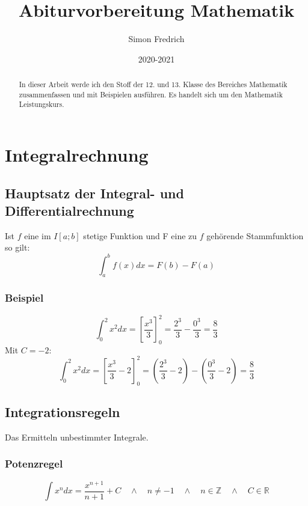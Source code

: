 \documentclass[12pt, a4paper]{report}
\title{Abiturvorbereitung Mathematik}
\author{Simon Fredrich}
\date{2020-2021}
\begin{document}
\begin{titlepage}
\maketitle
\end{titlepage}

\begin{abstract}
In dieser Arbeit werde ich den Stoff der 12. und 13. Klasse des Bereiches Mathematik zusammenfassen und mit Beispielen ausführen. Es handelt sich um den Mathematik Leistungskurs.
\end{abstract}

\chapter{Integralrechnung}

\section{Hauptsatz der Integral- und Differentialrechnung}
Ist $f$ eine im $I[a;b]$ stetige Funktion und F eine zu $f$ gehörende Stammfunktion so gilt:\\
\begin{equation}
\int_{a}^{b} f(x) dx = F(b)-F(a)
\end{equation}

\subsection{Beispiel}

\begin{equation}
\int_{0}^{2} x^2 dx = \left[\frac{x^3}{3}\right]_0^2=\frac{2^3}{3}-\frac{0^3}{3}=\frac{8}{3}
\end{equation}
Mit $C=-2$:
\begin{equation}
\int_{0}^{2} x^2 dx = \left[\frac{x^3}{3}-2\right]_0^2=\left(\frac{2^3}{3}-2\right)-\left(\frac{0^3}{3}-2\right)=\frac{8}{3}
\end{equation}

\section{Integrationsregeln}
Das Ermitteln unbestimmter Integrale.
\subsection{Potenzregel}
\begin{equation}
\int x^n dx = \frac{x^{n+1}}{n+1}+C\quad \land \quad n\neq-1\quad \land \quad n\in \mathbb{Z}\quad \land \quad  C\in \mathbb{R}
\end{equation}
\end{document}
